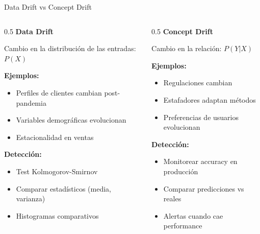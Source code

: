 \documentclass[aspectratio=169]{beamer}
\begin{document}
\begin{frame}{Data Drift vs Concept Drift}
\begin{columns}
\begin{column}{0.5\textwidth}
\textbf{Data Drift}

Cambio en la distribución de las entradas: $P(X)$

\vspace{0.2cm}

\textbf{Ejemplos:}
\begin{itemize}
\item Perfiles de clientes cambian post-pandemia
\item Variables demográficas evolucionan
\item Estacionalidad en ventas
\end{itemize}

\vspace{0.2cm}

\textbf{Detección:}
\begin{itemize}
\item Test Kolmogorov-Smirnov
\item Comparar estadísticos (media, varianza)
\item Histogramas comparativos
\end{itemize}
\end{column}

\begin{column}{0.5\textwidth}
\textbf{Concept Drift}

Cambio en la relación: $P(Y|X)$

\vspace{0.2cm}

\textbf{Ejemplos:}
\begin{itemize}
\item Regulaciones cambian
\item Estafadores adaptan métodos
\item Preferencias de usuarios evolucionan
\end{itemize}

\vspace{0.2cm}

\textbf{Detección:}
\begin{itemize}
\item Monitorear accuracy en producción
\item Comparar predicciones vs reales
\item Alertas cuando cae performance
\end{itemize}
\end{column}
\end{columns}
\end{frame}
\end{document}
